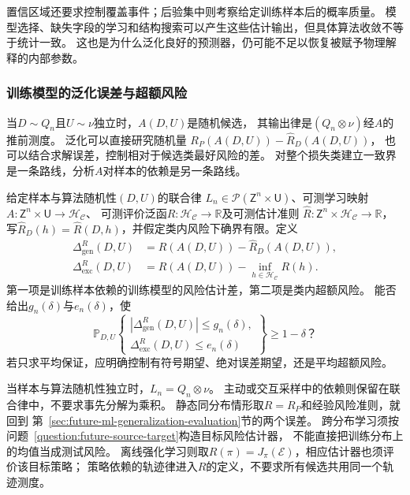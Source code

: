 置信区域还要求控制覆盖事件；后验集中则考察给定训练样本后的概率质量。
模型选择、缺失字段的学习和结构搜索可以产生这些估计输出，但具体算法收敛不等于统计一致。
这也是为什么泛化良好的预测器，仍可能不足以恢复被赋予物理解释的内部参数。

\subsubsection{训练模型的泛化误差与超额风险}
\label{sec:future-analysis-learned-risk}

当$D\sim Q_n$且$U\sim\nu$独立时，$A(D,U)$是随机候选，
其输出律是$(Q_n\otimes\nu)$经$A$的推前测度。
泛化可以直接研究随机量
$R_P(A(D,U))-\widehat R_D(A(D,U))$，
也可以结合求解误差，控制相对于候选类最好风险的差。
对整个损失类建立一致界是一条路线，分析$A$对样本的依赖是另一条路线。

\begin{mathproblem}[给定学习规则的泛化与超额风险]
  \label{question:future-learned-risk}
  给定样本与算法随机性$(D,U)$的联合律
  $L_n\in\mathcal P(\mathsf Z^n\times\mathsf U)$、可测学习映射
  $A:\mathsf Z^n\times\mathsf U\to\mathcal H_{\mathcal C}$、
  可测评价泛函$R:\mathcal H_{\mathcal C}\to\mathbb R$及可测估计准则
  $\widehat R:\mathsf Z^n\times\mathcal H_{\mathcal C}\to\mathbb R$，
  写$\widehat R_D(h)=\widehat R(D,h)$，并假定类内风险下确界有限。定义
  \[
    \begin{aligned}
      \Delta_{\mathrm{gen}}^R(D,U)
        &=R(A(D,U))-\widehat R_D(A(D,U)),\\
      \Delta_{\mathrm{exc}}^R(D,U)
        &=R(A(D,U))-\inf_{h\in\mathcal H_{\mathcal C}}R(h).
    \end{aligned}
  \]
  第一项是训练样本依赖的训练模型的风险估计差，第二项是类内超额风险。
  能否给出$g_n(\delta)$与$e_n(\delta)$，使
  \[
    \mathbb P_{D,U}\!\left\{
      \begin{gathered}
        |\Delta_{\mathrm{gen}}^R(D,U)|\leq g_n(\delta),\\
        \Delta_{\mathrm{exc}}^R(D,U)\leq e_n(\delta)
      \end{gathered}
    \right\}\geq1-\delta\text{？}
  \]
  若只求平均保证，应明确控制有符号期望、绝对误差期望，还是平均超额风险。
\end{mathproblem}

当样本与算法随机性独立时，$L_n=Q_n\otimes\nu$。
主动或交互采样中的依赖则保留在联合律中，不要求事先分解为乘积。
静态同分布情形取$R=R_P$和经验风险准则，就回到
第~\ref{sec:future-ml-generalization-evaluation}节的两个误差。
跨分布学习须按问题~\ref{question:future-source-target}构造目标风险估计器，
不能直接把训练分布上的均值当成测试风险。
离线强化学习则取$R(\pi)=J_\pi(\mathcal E)$，相应估计器也须评价该目标策略；
策略依赖的轨迹律进入$R$的定义，不要求所有候选共用同一个轨迹测度。

